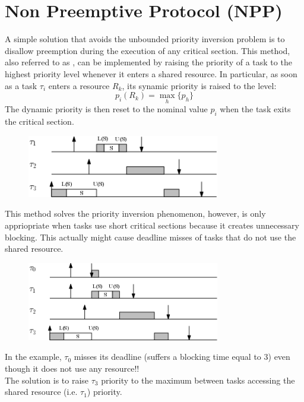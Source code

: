 \section{Non Preemptive Protocol (NPP)} 
A simple solution that avoids the unbounded priority inversion problem is to disallow preemption during the execution of any critical section. This method, also referred to as , can be implemented by raising the priority of a task to the highest priority level whenever it enters a shared resource. In particular, as soon as a task $\tau_i$ enters a resource $R_k$, its synamic priority is raised to the level:
\[p_i(R_k) = \max_h \{p_h\}\]
The dynamic priority is then reset to the nominal value $p_i$ when the task exits the critical section.

\begin{figure}[!h]
    \centering
    \includegraphics[width =0.75\textwidth]{images/image06.png}
\end{figure}


This method solves the priority inversion phenomenon, however, is only appriopriate when tasks use short critical sections because it creates unnecessary blocking. This actually might cause deadline misses of tasks that do not use the shared resource.

\begin{figure}[!h]
    \centering
    \includegraphics[width =0.75\textwidth]{images/image07.png}
\end{figure}
In the example, $\tau_0$ misses its deadline (suffers a blocking time equal to 3) even though it does not use any resource!!\\
The solution is to raise $\tau_3$ priority to the maximum between tasks accessing the shared resource (i.e. $\tau_1$) priority.



